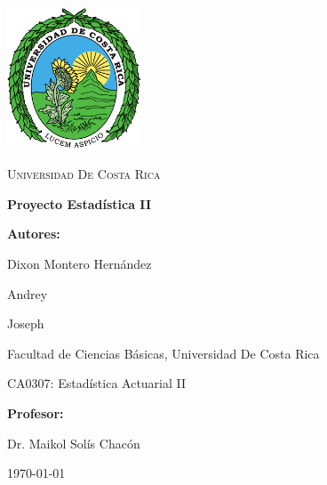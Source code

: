 \documentclass[12pt, a4paper]{article}
\begin{document}
\begin{titlepage}
    \centering
    
    \includegraphics[width=0.3\textwidth]{LogoUCR.png}\par\vspace{1cm}
    
    {\scshape\LARGE Universidad De Costa Rica \par}
    \vspace{2cm}
    
    {\Huge\bfseries Proyecto Estadística II\par}
    \vspace{3cm}

    {\large \bfseries Autores:\par}
    {\Large Dixon Montero Hernández \par}
    {\Large Andrey \par}
    {\Large Joseph\par}
    \vspace{0.5cm}
    {\large Facultad de Ciencias Básicas, Universidad De Costa Rica\par}
    {\large CA0307: Estadística Actuarial II}
    \vspace{2cm}

    {\large\bfseries Profesor:\par}
    {\large Dr. Maikol Solís Chacón}
    
    \vfill
    
    {\large \today\par}
\end{titlepage}
\end{document}
